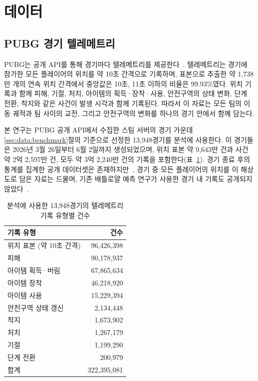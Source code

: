 \section{데이터}
\label{sec:data}

\subsection{PUBG 경기 텔레메트리}
\label{sec:data:telemetry}

PUBG는 공개 API를 통해 경기마다 텔레메트리를 제공한다~\cite{PUBGAPI}.
텔레메트리는 경기에 참가한 모든 플레이어의 위치를 약 10초 간격으로 기록하며, 표본으로 추출한 약 1,738만 개의 연속 위치 간격에서 중앙값은 10초, 11초 이하의 비율은 99.93\%였다.
위치 기록과 함께 피해, 기절, 처치, 아이템의 획득·장착·사용, 안전구역의 상태 변화, 단계 전환, 착지와 같은 사건이 발생 시각과 함께 기록된다.
따라서 이 자료는 모든 팀의 이동 궤적과 팀 사이의 교전, 그리고 안전구역의 변화를 하나의 경기 안에서 함께 담는다.

본 연구는 PUBG 공개 API에서 수집한 스팀 서버의 경기 가운데 \ref{sec:data:benchmark}절의 기준으로 선정한 13,948경기를 분석에 사용한다.
이 경기들은 2026년 3월 26일부터 6월 2일까지 생성되었으며, 위치 표본 약 9,643만 건과 사건 약 2억 2,597만 건, 모두 약 3억 2,240만 건의 기록을 포함한다(표~\ref{tab:corpus}).
경기 종료 후의 통계를 집계한 공개 데이터셋은 존재하지만~\cite{KagglePUBG}, 경기 중 모든 플레이어의 위치를 이 해상도로 담은 자료는 드물며, 기존 배틀로얄 예측 연구가 사용한 경기 내 기록도 공개되지 않았다~\cite{Sagong25a,KRAFTON}.

\begin{table}[t]
\centering
\caption{분석에 사용한 13,948경기의 텔레메트리 기록 유형별 건수}
\label{tab:corpus}
\begin{tabular}{lr}
\hline
기록 유형 & 건수 \\
\hline
위치 표본 (약 10초 간격) & 96,426,398 \\
피해 & 90,178,937 \\
아이템 획득·버림 & 67,865,634 \\
아이템 장착 & 46,218,920 \\
아이템 사용 & 15,229,394 \\
안전구역 상태 갱신 & 2,134,448 \\
착지 & 1,673,902 \\
처치 & 1,267,179 \\
기절 & 1,199,290 \\
단계 전환 & 200,979 \\
\hline
합계 & 322,395,081 \\
\hline
\end{tabular}
\end{table}

